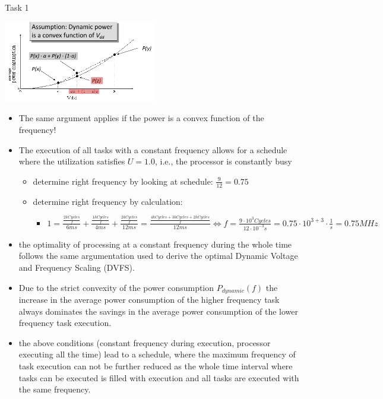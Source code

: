 \begin{frame}[allowframebreaks]{Task 1}{}
\begin{requirementsnoinc}
    \includegraphics[width=0.5\textwidth]{./figures/task2_power_convex.png}
    \begin{itemize}
        \item The same argument applies if the power is a convex function of the \alert{frequency}!
    \end{itemize}
  \end{requirementsnoinc}
  \begin{solutionnoinc}
    \begin{itemize}
      \item The execution of all tasks with a constant frequency allows for a schedule where the utilization satisfies $U = 1.0$, i.e., the processor is constantly busy
        \begin{itemize}
          \item determine right frequency by looking at schedule: $\frac{9}{12} = 0.75$
          \item determine right frequency by calculation:
            \begin{itemize}
              \item $1 = \frac{\frac{2 kCycles}{f}}{6ms} + \frac{\frac{1 kCycles}{f}}{4ms}  + \frac{\frac{2 kCycles}{f}}{12ms} = \frac{\frac{4 kCycles + 3 kCycles + 2 kCycles}{f}}{12ms} \Leftrightarrow f = \frac{9 \cdot 10^3 Cycles}{12 \cdot 10^{-3} s} = 0.75 \cdot 10^{3 + 3} \cdot \frac{1}{s}  = 0.75MHz$
            \end{itemize}
        \end{itemize}
      \item the optimality of processing at a constant frequency during the whole time follows the same argumentation used to derive the optimal Dynamic Voltage and Frequency Scaling (DVFS).
    \end{itemize}
  \end{solutionnoinc}
  \begin{solutionnoinc}
    \small
    \begin{itemize}
      \item Due to the strict convexity of the power consumption $P_{dynamic}(f)$ the increase in the average power consumption of the higher frequency task always dominates the savings in the average power consumption of the lower frequency task execution.
      \item the above conditions (constant frequency during execution, processor executing all the time) lead to a schedule, where the maximum frequency of task execution can not be further reduced as the whole time interval where tasks can be executed is filled with execution and all tasks are executed with the same frequency.
    \end{itemize}
  \end{solutionnoinc}
\end{frame}
